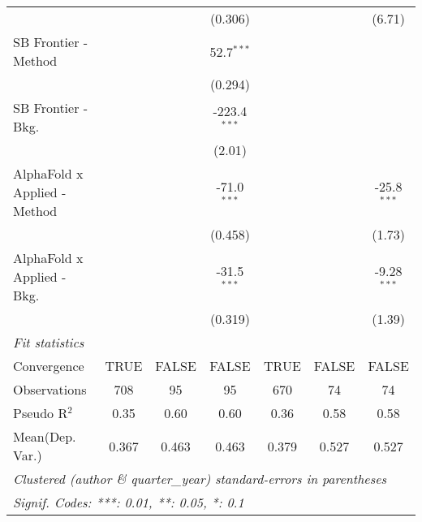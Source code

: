 \begin{tabular}{lcccccc}
                                &               &               & (0.306)        &               &               & (6.71)\\   
   SB Frontier - Method         &               &               & 52.7$^{***}$   &               &               &   \\   
                                &               &               & (0.294)        &               &               &   \\   
   SB Frontier - Bkg.           &               &               & -223.4$^{***}$ &               &               &   \\   
                                &               &               & (2.01)         &               &               &   \\   
   AlphaFold x Applied - Method &               &               & -71.0$^{***}$  &               &               & -25.8$^{***}$\\   
                                &               &               & (0.458)        &               &               & (1.73)\\   
   AlphaFold x Applied - Bkg.   &               &               & -31.5$^{***}$  &               &               & -9.28$^{***}$\\   
                                &               &               & (0.319)        &               &               & (1.39)\\   
   \midrule
   \emph{Fit statistics}\\
   Convergence                  &TRUE           & FALSE         & FALSE          & TRUE          & FALSE         & FALSE\\  
   Observations                 & 708           & 95            & 95             & 670           & 74            & 74\\  
   Pseudo R$^2$                 & 0.35          & 0.60          & 0.60           & 0.36          & 0.58          & 0.58\\  
Mean(Dep. Var.) & 0.367 & 0.463 & 0.463 & 0.379 & 0.527 & 0.527 \\
   \midrule \midrule
   \multicolumn{7}{l}{\emph{Clustered (author \& quarter\_year) standard-errors in parentheses}}\\
   \multicolumn{7}{l}{\emph{Signif. Codes: ***: 0.01, **: 0.05, *: 0.1}}\\
\end{tabular}
\par\endgroup
